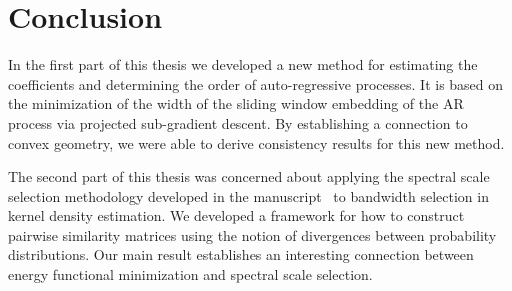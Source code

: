 \chapter{Conclusion}

In the first part of this thesis we developed a new method for estimating the coefficients and determining the order of auto-regressive processes. It is based on the minimization of the width of the sliding window embedding of the AR process via projected sub-gradient descent. By establishing a connection to convex geometry, we were able to derive consistency results for this new method.

The second part of this thesis was concerned about applying the spectral scale selection methodology developed in the manuscript~\cite{Baralic2026} to bandwidth selection in kernel density estimation. We developed a framework for how to construct pairwise similarity matrices using the notion of divergences between probability distributions. Our main result establishes an interesting connection between energy functional minimization and spectral scale selection. 